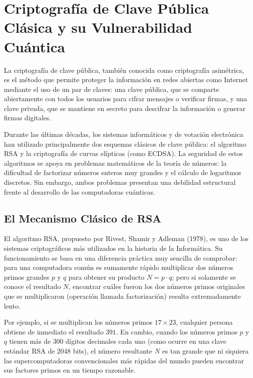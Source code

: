\section{Criptografía de Clave Pública Clásica y su Vulnerabilidad Cuántica}

La criptografía de clave pública, también conocida como criptografía asimétrica, es el método que permite proteger la información en redes abiertas como Internet mediante el uso de un par de claves: una clave pública, que se comparte abiertamente con todos los usuarios para cifrar mensajes o verificar firmas, y una clave privada, que se mantiene en secreto para descifrar la información o generar firmas digitales.

Durante las últimas décadas, los sistemas informáticos y de votación electrónica han utilizado principalmente dos esquemas clásicos de clave pública: el algoritmo RSA y la criptografía de curvas elípticas (como ECDSA). La seguridad de estos algoritmos se apoya en problemas matemáticos de la teoría de números: la dificultad de factorizar números enteros muy grandes y el cálculo de logaritmos discretos. Sin embargo, ambos problemas presentan una debilidad estructural frente al desarrollo de las computadoras cuánticas.

\subsection{El Mecanismo Clásico de RSA}

El algoritmo RSA, propuesto por Rivest, Shamir y Adleman (1978), es uno de los sistemas criptográficos más utilizados en la historia de la Informática. Su funcionamiento se basa en una diferencia práctica muy sencilla de comprobar: para una computadora común es sumamente rápido multiplicar dos números primos grandes $p$ y $q$ para obtener su producto $N = p \cdot q$; pero si solamente se conoce el resultado $N$, encontrar cuáles fueron los dos números primos originales que se multiplicaron (operación llamada factorización) resulta extremadamente lento.

Por ejemplo, si se multiplican los números primos $17 \times 23$, cualquier persona obtiene de inmediato el resultado $391$. En cambio, cuando los números primos $p$ y $q$ tienen más de $300$ dígitos decimales cada uno (como ocurre en una clave estándar RSA de $2048$ bits), el número resultante $N$ es tan grande que ni siquiera las supercomputadoras convencionales más rápidas del mundo pueden encontrar sus factores primos en un tiempo razonable.

